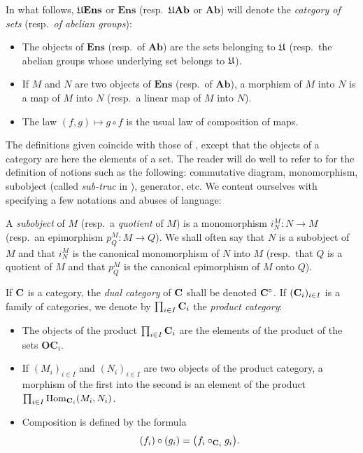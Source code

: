 In what follows, $\mathfrak{U}\mathbf{Ens}$ or $\mathbf{Ens}$ (resp.\
$\mathfrak{U}\mathbf{Ab}$ or $\mathbf{Ab}$) will denote the \emph{category of sets}
(resp.\ \emph{of abelian groups}):

\begin{itemize}
\item The objects of $\mathbf{Ens}$ (resp.\ of $\mathbf{Ab}$) are the sets
      belonging to $\mathfrak{U}$ (resp.\ the abelian groups whose underlying set
      belongs to $\mathfrak{U}$).
\item If $M$ and $N$ are two objects of $\mathbf{Ens}$ (resp.\ of
      $\mathbf{Ab}$), a morphism of $M$ into $N$ is a map of $M$ into $N$
      (resp.\ a linear map of $M$ into $N$).
\item The law $(f,g)\mapsto g\circ f$ is the usual law of composition of
      maps.
\end{itemize}

The definitions given coincide with those of \cite{grothendieck-1}, except that the objects of
a category are here the elements of a set. The reader will do well to refer
to \cite{grothendieck-1} for the definition of notions such as the following: commutative
diagram, monomorphism, subobject (called \emph{sub-truc} in \cite{grothendieck-1}),
generator, etc. We content ourselves with specifying a few notations and
abuses of language:

A \emph{subobject} of $M$ (resp.\ a \emph{quotient} of $M$) is a
monomorphism $i_N^M\colon N\to M$ (resp.\ an epimorphism
$p_Q^M\colon M\to Q$). We shall often say that $N$ is a subobject of $M$ and
that $i_N^M$ is the canonical monomorphism of $N$ into $M$ (resp.\ that $Q$
is a quotient of $M$ and that $p_Q^M$ is the canonical epimorphism of $M$
onto $Q$).

If $\mathbf{C}$ is a category, the \emph{dual category} of $\mathbf{C}$ shall be denoted
$\mathbf{C}^{\circ}$. If $(\mathbf{C}_i)_{i\in I}$ is a family of categories, we denote
by $\prod_{i\in I}\mathbf{C}_i$ the \emph{product category}:

\begin{itemize}
\item The objects of the product $\prod_{i\in I}\mathbf{C}_i$ are the elements of
      the product of the sets $\mathbf{OC}_i$.
\item If $(M_i)_{i\in I}$ and $(N_i)_{i\in I}$ are two objects of the
      product category, a morphism of the first into the second is an element
      of the product
      $\prod_{i\in I}\operatorname{Hom}_{\mathbf{C}_i}(M_i,N_i)$.
\item Composition is defined by the formula
\[
  (f_i)\circ(g_i) = \bigl(f_i\circ_{\mathbf{C}_i}g_i\bigr).
\]
\end{itemize}

